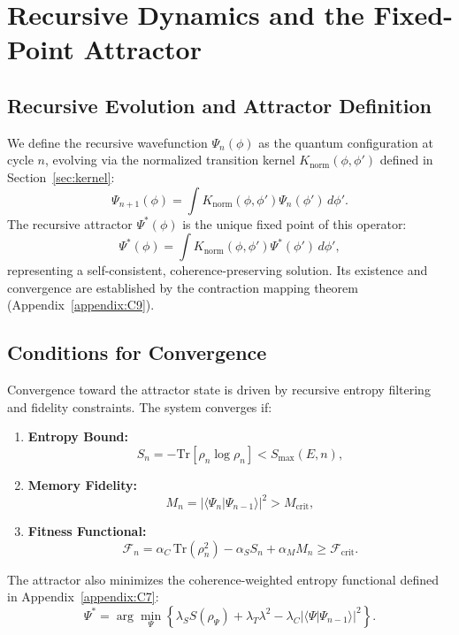 \section{Recursive Dynamics and the Fixed-Point Attractor}
\label{sec:attractor}

\subsection{Recursive Evolution and Attractor Definition}

We define the recursive wavefunction \( \Psi_n(\phi) \) as the quantum configuration at cycle \( n \), evolving via the normalized transition kernel \( K_{\text{norm}}(\phi, \phi') \) defined in Section~\ref{sec:kernel}:
\[
\Psi_{n+1}(\phi) = \int K_{\text{norm}}(\phi, \phi') \Psi_n(\phi') \, d\phi'.
\]
The recursive attractor \( \Psi^*(\phi) \) is the unique fixed point of this operator:
\[
\Psi^*(\phi) = \int K_{\text{norm}}(\phi, \phi') \Psi^*(\phi') \, d\phi',
\]
representing a self-consistent, coherence-preserving solution. Its existence and convergence are established by the contraction mapping theorem (Appendix~\ref{appendix:C9}).

\subsection{Conditions for Convergence}

Convergence toward the attractor state is driven by recursive entropy filtering and fidelity constraints. The system converges if:

\begin{enumerate}
    \item \textbf{Entropy Bound:}
    \[
    S_n = -\mathrm{Tr}[\rho_n \log \rho_n] < S_{\text{max}}(E, n),
    \]
    \item \textbf{Memory Fidelity:}
    \[
    M_n = |\langle \Psi_n | \Psi_{n-1} \rangle|^2 > M_{\text{crit}},
    \]
    \item \textbf{Fitness Functional:}
    \[
    \mathcal{F}_n = \alpha_C \, \mathrm{Tr}(\rho_n^2) - \alpha_S S_n + \alpha_M M_n \geq \mathcal{F}_{\text{crit}}.
    \]
\end{enumerate}

The attractor also minimizes the coherence-weighted entropy functional defined in Appendix~\ref{appendix:C7}:
\[
\Psi^* = \arg\min_{\Psi} \left\{ \lambda_S S(\rho_\Psi) + \lambda_T \lambda^2 - \lambda_C |\langle \Psi | \Psi_{n-1} \rangle|^2 \right\}.
\]

